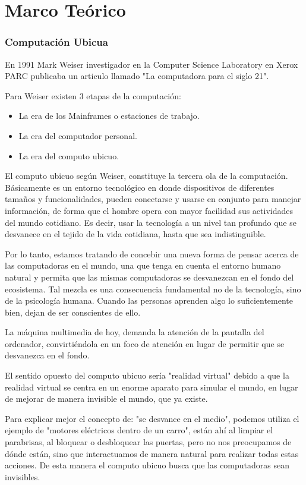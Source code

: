 \chapter{Marco Te\'orico}

\subsection{Computaci\'on Ubicua}

En 1991 Mark Weiser investigador en la Computer Science Laboratory en Xerox PARC publicaba un articulo llamado "La computadora para el siglo 21".

Para Weiser existen 3 etapas de la computación:

\begin{itemize}
    \item La era de los Mainframes o estaciones de trabajo.
    \item La era del computador personal.
    \item La era del computo ubicuo.
\end{itemize}

El computo ubicuo según Weiser, constituye la tercera ola de la computación. Básicamente es un entorno tecnológico en donde dispositivos de diferentes tamaños y funcionalidades, pueden conectarse y usarse en conjunto para manejar información, de forma que el hombre opera con mayor facilidad sus actividades del mundo cotidiano. Es decir, usar la tecnología a un nivel tan profundo que se desvanece en el tejido de la vida cotidiana, hasta que sea indistinguible.

Por lo tanto, estamos tratando de concebir una nueva forma de pensar acerca de las computadoras en el mundo, una que tenga en cuenta el entorno humano natural y permita que las mismas computadoras se desvanezcan en el fondo del ecosistema. Tal mezcla es una consecuencia fundamental no de la tecnología, sino de la psicología humana. Cuando las personas aprenden algo lo suficientemente bien, dejan de ser conscientes de ello.

La máquina multimedia de hoy, demanda la atención de la pantalla del ordenador, convirtiéndola en un foco de atención en lugar de permitir que se desvanezca en el fondo.

El sentido opuesto del computo ubicuo sería "realidad virtual" debido a que la realidad virtual se centra en un enorme aparato para simular el mundo, en lugar de mejorar de manera invisible el mundo, que ya existe.

Para explicar mejor el concepto de: "se desvance en el medio", podemos utiliza el ejemplo de "motores eléctricos dentro de un carro", están ahí al limpiar el parabrisas, al bloquear o desbloquear las puertas, pero no nos preocupamos de dónde están, sino que interactuamos de manera natural para realizar todas estas acciones. De esta manera el computo ubicuo busca que las computadoras sean invisibles.

